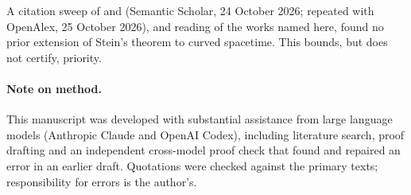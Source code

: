 \documentclass[11pt]{article}
\theoremstyle{definition}
\begin{document}
A citation sweep of
\citet{CH1995} and \citet{Stein1991} (Semantic Scholar, 24 October 2026; repeated
with OpenAlex, 25 October 2026), and
reading of the works named here, found no prior extension of
Stein's theorem to curved spacetime. This bounds, but does not certify,
priority.

\paragraph{Note on method.} This manuscript was developed with substantial
assistance from large language models (Anthropic Claude and OpenAI Codex),
including literature search, proof drafting and an independent cross-model
proof check that found and repaired an error in an earlier draft. Quotations
were checked against the primary texts; responsibility for errors is the
author's.
\end{document}
